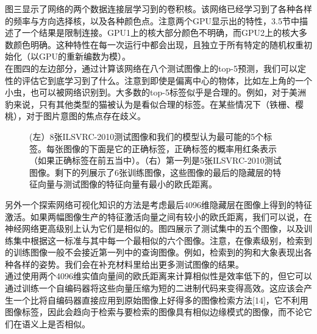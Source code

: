 图三显示了网络的两个数据连接层学习到的卷积核。该网络已经学习到了各种各样的频率与方向选择核，以及各种颜色点。注意两个GPU显示出的特性，3.5节中描述了一个结果是限制连接。GPU1上的核大部分颜色不明确，而GPU2上的核大多数颜色明确。这种特性在每一次运行中都会出现，且独立于所有特定的随机权重初始化（以GPU的重新编数为模）。\\ 

在图四的左边部分，通过计算该网络在八个测试图像上的top-5预测，我们可以定性的评估它到底学习到了什么。注意到即使是偏离中心的物体，比如左上角的一个小虫，也可以被网络识别到。大多数的top-5标签似乎是合理的。例如，对于美洲豹来说，只有其他类型的猫被认为是看似合理的标签。在某些情况下（铁栅、樱桃），对于图片意图的焦点存在歧义。\\

\begin{figure}[h]
  \centering
  \caption{(左）8张ILSVRC-2010测试图像和我们的模型认为最可能的5个标签。每张图像的下面是它的正确标签，正确标签的概率用红条表示（如果正确标签在前五当中）。（右）第一列是5张ILSVRC-2010测试图像。剩下的列展示了6张训练图像，这些图像的最后的隐藏层的特征向量与测试图像的特征向量有最小的欧氏距离。}
  \label{fig:fig4}
\end{figure}

另外一个探索网络可视化知识的方法是考虑最后4096维隐藏层在图像上得到的特征激活。如果两幅图像生产的特征激活向量之间有较小的欧氏距离，我们可以说，在神经网络更高级别上认为它们是相似的。图四展示了测试集中的五个图像，以及训练集中根据这一标准与其中每一个最相似的六个图像。注意，在像素级别，检索到的训练图像一般不会接近第一列中的查询图像。例如，检索到的狗和大象表现出各种各样的姿势。我们会在补充材料里给出更多测试图像的结果。\\

通过使用两个4096维实值向量间的欧氏距离来计算相似性是效率低下的，但它可以通过训练一个自编码器将这些向量压缩为短的二进制代码来变得高效。这应该会产生一个比将自编码器直接应用到原始图像上好得多的图像检索方法[14]，它不利用图像标签，因此会趋向于检索与要检索的图像具有相似边缘模式的图像，而不论它们在语义上是否相似。\\
